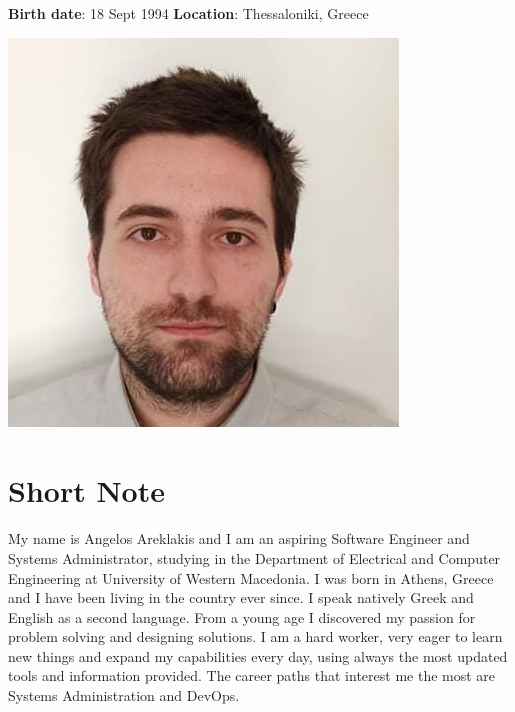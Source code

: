 \documentclass{mycv}
\begin{document}
	\pagestyle{empty}
	\begin{minipage}{.7\textwidth}
		\begin{flushleft}
			\centering
			{\bf Birth date}: 18 Sept 1994 {\Large\textperiodcentered} {\bf Location}: Thessaloniki, Greece
		\end{flushleft}
	\end{minipage}
	\begin{minipage}{.3\textwidth}
		\begin{flushright}
			\includegraphics[scale=0.3]{assets/angelos.png}
		\end{flushright}
	\end{minipage}
	\vspace*{-0.5cm}
	\section{Short Note}
	\textnormal My name is Angelos Areklakis and I am an aspiring Software Engineer and Systems Administrator, studying in the Department of Electrical and Computer Engineering at University of Western Macedonia. I was born in Athens, Greece and I have been living in the country ever since. I speak natively Greek and English as a second language. From a young age I discovered my passion for problem solving and designing solutions. I am a hard worker, very eager to learn new things and expand my capabilities every day, using always the most updated tools and information provided. The career paths that interest me the most are Systems Administration and DevOps.
\end{document}
